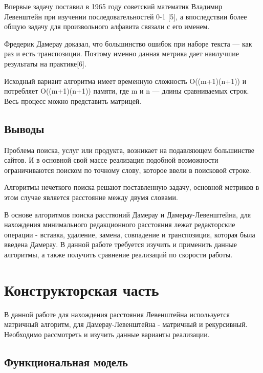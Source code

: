 \documentclass[a4paper,14pt]{article} %
\begin{document}
        Впервые задачу поставил в 1965 году советский математик Владимир Левенштейн при изучении последовательностей 0-1 [5], а впоследствии более общую задачу для произвольного алфавита связали с его именем. 
        \hfill
        
        Фредерик Дамерау доказал, что большинство ошибок при наборе текста — как раз и есть транспозиции. Поэтому именно данная метрика дает наилучшие результаты на практике[6].
        \hfill
        
        Исходный вариант алгоритма имеет временную сложность O((m+1)(n+1)) и потребляет O((m+1)(n+1)) памяти, где m и n — длины сравниваемых строк. Весь процесс можно представить матрицей. 
        
           \subsection{Выводы} 
           \hfill
           
           Проблема поиска, услуг или продукта, возникает на подавляющем большинстве сайтов. И в основной свой массе реализация подобной возможности ограничиваются поиском по точному слову, которое ввели в поисковой строке.
           \hfill
           
           Алгоритмы нечеткого поиска решают поставленную задачу, основной метриков в этом случае является расстояние между двумя словами. 
           \hfill
           
           В основе алгоритмов поиска расстяоний Дамерау и Дамерау-Левенштейна, для нахождения минимального редакционного расстояния лежат редакторские операции - вставка, удаление, замена, совпадение и транспозиция, которая была введена Дамерау. В данной работе требуется изучить и применить данные алгоритмы, а также получить сравнение реализаций по скорости работы. 
	  
	\newpage

	\section{Конструкторская часть}
	\hfill
	
	В данной работе для нахождения расстояния Левенштейна используется матричный алгоритм, для Дамерау-Левенштейна - матричный и рекурсивный. Необходимо рассмотреть и изучить данные варианты реализации. 
	\subsection{Функциональная модель}
	\hfill
	
\end{document}
